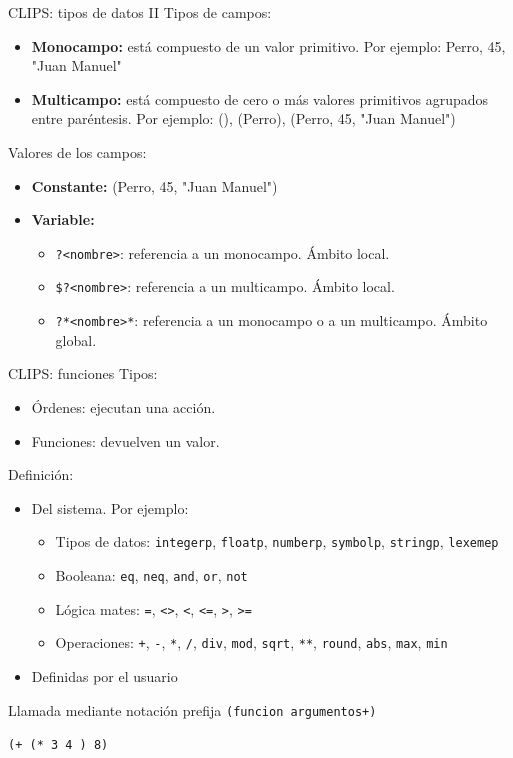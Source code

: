 \documentclass[usenames,dvipsnames,aspectratio=169]{beamer}
\begin{document}
\begin{frame}{CLIPS: tipos de datos II}
	Tipos de campos:
	\begin{itemize}
		\item \textbf{Monocampo:} está compuesto de un valor primitivo. Por ejemplo: Perro, 45, "Juan Manuel"
		\item \textbf{Multicampo:} está compuesto de cero o más valores primitivos agrupados entre paréntesis. Por ejemplo: (), (Perro), (Perro, 45, "Juan Manuel")
	\end{itemize}
	Valores de los campos:
	\begin{itemize}
		\item \textbf{Constante:} (Perro, 45, "Juan Manuel")
		\item \textbf{Variable:}
		\begin{itemize}
			\item \texttt{?<nombre>}: referencia a un monocampo. Ámbito local.
			\item \texttt{\$?<nombre>}: referencia a un multicampo. Ámbito local.
			\item \texttt{?*<nombre>*}: referencia a un monocampo o a un multicampo. Ámbito global.
		\end{itemize}
	\end{itemize}
\end{frame}

\begin{frame}{CLIPS: funciones}
	Tipos:
	\begin{itemize}
		\item Órdenes: ejecutan una acción.
		\item Funciones: devuelven un valor.
	\end{itemize}
	Definición:
	\begin{itemize}
		\item Del sistema. Por ejemplo:
		\begin{itemize}
			\item Tipos de datos: \texttt{integerp}, \texttt{floatp}, \texttt{numberp}, \texttt{symbolp}, \texttt{stringp}, \texttt{lexemep}
			\item Booleana: \texttt{eq}, \texttt{neq}, \texttt{and}, \texttt{or}, \texttt{not}
			\item Lógica mates: \texttt{=}, \texttt{<>}, \texttt{<}, \texttt{<=}, \texttt{>}, \texttt{>=}
			\item Operaciones: \texttt{+}, \texttt{-}, \texttt{*}, \texttt{/}, \texttt{div}, \texttt{mod}, \texttt{sqrt}, \texttt{**}, \texttt{round}, \texttt{abs}, \texttt{max}, \texttt{min}
		\end{itemize}
		\item Definidas por el usuario
	\end{itemize}
	\begin{block}{Llamada mediante notación prefija}
		\texttt{(funcion argumentos+)}
		
		\texttt{(+ (* 3 4 ) 8)}
	\end{block}
\end{frame}
\end{document}
